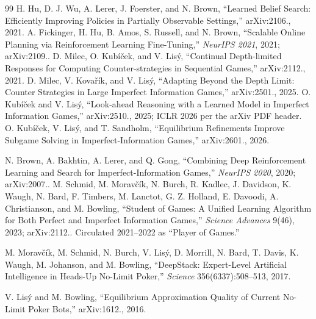 \begin{thebibliography}{99}
H. Hu, D. J. Wu, A. Lerer, J. Foerster, and N. Brown, ``Learned Belief Search:
Efficiently Improving Policies in Partially Observable Settings,''
arXiv:2106., 2021.
A. Fickinger, H. Hu, B. Amos, S. Russell, and N. Brown, ``Scalable Online
Planning via Reinforcement Learning Fine-Tuning,'' \emph{NeurIPS 2021}, 2021;
arXiv:2109..
D. Milec, O. Kub\'i\v{c}ek, and V. Lis\'y, ``Continual Depth-limited Responses
for Computing Counter-strategies in Sequential Games,'' arXiv:2112., 2021.
D. Milec, V. Kova\v{r}\'ik, and V. Lis\'y, ``Adapting Beyond the Depth Limit:
Counter Strategies in Large Imperfect Information Games,'' arXiv:2501.,
2025.
O. Kub\'i\v{c}ek and V. Lis\'y, ``Look-ahead Reasoning with a Learned Model in
Imperfect Information Games,'' arXiv:2510., 2025; ICLR 2026 per the arXiv
PDF header.
O. Kub\'i\v{c}ek, V. Lis\'y, and T. Sandholm, ``Equilibrium Refinements Improve
Subgame Solving in Imperfect-Information Games,'' arXiv:2601., 2026.

N. Brown, A. Bakhtin, A. Lerer, and Q. Gong, ``Combining Deep Reinforcement
Learning and Search for Imperfect-Information Games,'' \emph{NeurIPS 2020},
2020; arXiv:2007..
M. Schmid, M. Morav\v{c}\'ik, N. Burch, R. Kadlec, J. Davidson, K. Waugh,
N. Bard, F. Timbers, M. Lanctot, G. Z. Holland, E. Davoodi, A. Christianson, and
M. Bowling, ``Student of Games: A Unified Learning Algorithm for Both Perfect
and Imperfect Information Games,'' \emph{Science Advances} 9(46), 2023;
arXiv:2112.. Circulated 2021--2022 as ``Player of Games.''

M. Morav\v{c}\'ik, M. Schmid, N. Burch, V. Lis\'y, D. Morrill, N. Bard,
T. Davis, K. Waugh, M. Johanson, and M. Bowling, ``DeepStack: Expert-Level
Artificial Intelligence in Heads-Up No-Limit Poker,'' \emph{Science}
356(6337):508--513, 2017.

V. Lis\'y and M. Bowling, ``Equilibrium Approximation Quality of Current
No-Limit Poker Bots,'' arXiv:1612., 2016.


\end{thebibliography}
